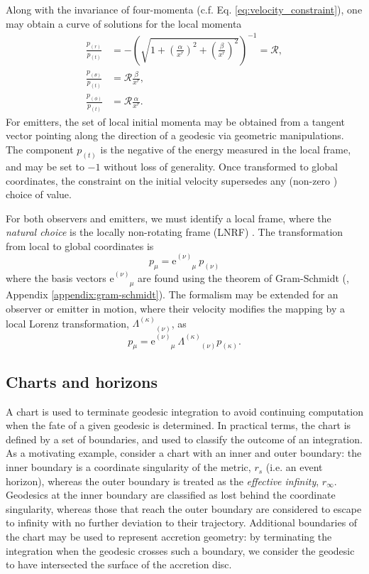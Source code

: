 Along with the invariance of four-momenta (c.f. Eq. \eqref{eq:velocity_constraint}), one may obtain a curve of solutions for the local momenta
\begin{align}
    \frac{p_{(r)}}{p_{(t)}} &= -\left( \sqrt{1 + \left(\frac{\alpha}{x^r}\right)^2 + \left(\frac{\beta}{x^r}\right)^2} \right)^{-1} = \mathscr{R}, \\
    \frac{p_{(\theta)}}{p_{(t)}} &= \mathscr{R} \frac{\beta}{x^r}, \\
    \frac{p_{(\phi)}}{p_{(t)}} &= \mathscr{R} \frac{\alpha}{x^r}.
\end{align}
For emitters, the set of local initial momenta may be obtained from a tangent vector pointing along the direction of a geodesic via geometric manipulations. The component $p_{(t)}$ is the negative of the energy measured in the local frame, and may be set to $-1$ without loss of generality. Once transformed to global coordinates, the constraint on the initial velocity supersedes any (non-zero ) choice of value.

For both observers and emitters, we must identify a local frame, where the \textit{natural choice} is the locally non-rotating frame (LNRF) \citep{bardeen_rotating_1972} . The transformation from local to global coordinates is
\begin{equation}
    p_\mu = \text{e}^{(\nu)}_{\phantom{(\nu)}\mu}\  p_{(\nu)}
\end{equation}
where the basis vectors $\text{e}^{(\nu)}_{\phantom{(\nu)}\mu}$ are found using the theorem of Gram-Schmidt (\cite{}, Appendix \ref{appendix:gram-schmidt}). The formalism may be extended for an observer or emitter in motion, where their velocity modifies the mapping by a local Lorenz transformation, $\Lambda^{(\kappa)}_{\phantom{(\kappa)}(\nu)}$, as 
\begin{equation}
    p_\mu = \text{e}^{(\nu)}_{\phantom{(\nu)}\mu}\  \Lambda^{(\kappa)}_{\phantom{(a)}(\nu)} p_{(\kappa)}.
\end{equation}

\subsection{Charts and horizons}

A chart is used to terminate geodesic integration to avoid continuing computation when the fate of a given geodesic is determined. In practical terms, the chart is defined by a set of boundaries, and used to classify the outcome of an integration. As a motivating example, consider a chart with an inner and outer boundary: the inner boundary is a coordinate singularity of the metric, $r_s$ (i.e. an event horizon), whereas the outer boundary is treated as the \textit{effective infinity}, $r_\infty$. Geodesics at the inner boundary are classified as lost behind the coordinate singularity, whereas those that reach the outer boundary are considered to escape to infinity with no further deviation to their trajectory. Additional boundaries of the chart may be used to represent accretion geometry: by terminating the integration when the geodesic crosses such a boundary, we consider the geodesic to have intersected the surface of the accretion disc. 

